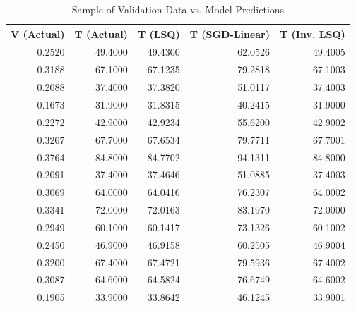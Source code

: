 \begin{table}[H]
\centering
\caption{Sample of Validation Data vs. Model Predictions}
\label{table:wheatstone_validation_comparison}
\begin{tabular}{rrrrr}
\toprule
 V (Actual) & T (Actual) & T (LSQ) & T (SGD-Linear) & T (Inv. LSQ) \\
\midrule
 0.2520 & 49.4000 & 49.4300 & 62.0526 & 49.4005 \\
 0.3188 & 67.1000 & 67.1235 & 79.2818 & 67.1003 \\
 0.2088 & 37.4000 & 37.3820 & 51.0117 & 37.4003 \\
 0.1673 & 31.9000 & 31.8315 & 40.2415 & 31.9000 \\
 0.2272 & 42.9000 & 42.9234 & 55.6200 & 42.9002 \\
 0.3207 & 67.7000 & 67.6534 & 79.7711 & 67.7001 \\
 0.3764 & 84.8000 & 84.7702 & 94.1311 
& 84.8000 \\
 0.2091 & 37.4000 & 37.4646 & 51.0885 & 37.4003 \\
 0.3069 & 64.0000 & 64.0416 & 76.2307 & 64.0002 \\
 0.3341 & 72.0000 & 72.0163 & 83.1970 & 72.0000 \\
 0.2949 & 60.1000 & 60.1417 & 73.1326 & 60.1002 \\
 0.2450 & 46.9000 & 46.9158 & 60.2505 & 46.9004 \\
 0.3200 & 67.4000 & 67.4721 & 79.5936 & 67.4002 \\
 0.3087 & 64.6000 & 64.5824 & 76.6749 & 64.6002 \\
 0.1905 & 33.9000 & 33.8642 & 46.1245 & 33.9001 \\
\bottomrule
\end{tabular}
\end{table}
